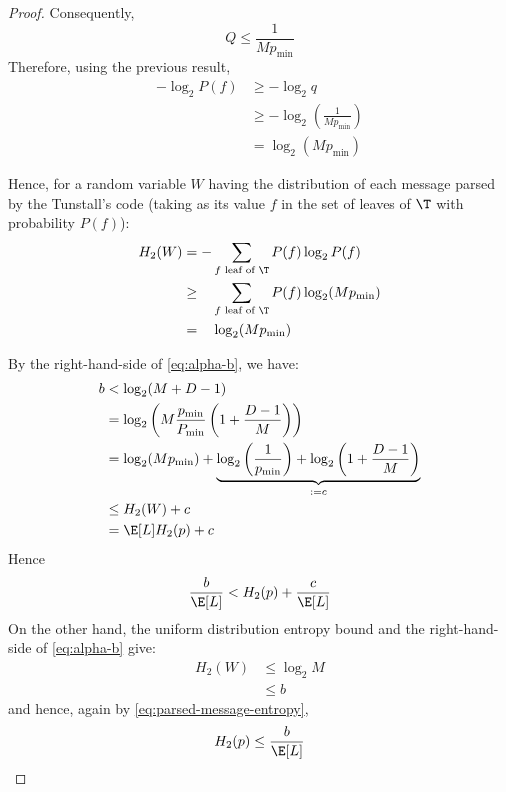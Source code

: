\documentclass[toc, titlepaged]{../cs-classes/cs-classes}
\begin{document}
\begin{proof}
    Consequently,
    \begin{equation*}
        Q \leq \frac{1}{Mp_{\min}}
    \end{equation*}
    Therefore, using the previous result,
    \begin{equation*}
        \begin{aligned}
            -\log_2P(f) &\geq -\log_2 q\\
            &\geq -\log_2\left(\frac{1}{Mp_{\min}}\right)\\
            &= \log_2(Mp_{\min})
        \end{aligned}
    \end{equation*}

    Hence, for a random variable $W$ having the distribution of each message parsed by the Tunstall's code (taking as its value $f$ in the set of leaves of $\T$ with probability $P(f)$):
    \begin{equation*}
        \begin{aligned}
            H_2(W) &= -\sum_{f \textnormal{ leaf of }\T}P(f)\log_2P(f)\\
            &\geq \phantom{-} \sum_{f \textnormal{ leaf of }\T}P(f)\log_2(Mp_{\min})\\
            &= \phantom{-} \log_2(Mp_{\min})
        \end{aligned}
    \end{equation*}

    By the right-hand-side of \eqref{eq:alpha-b}, we have:
    \begin{equation*}
        \begin{aligned}
            b &< \log_2(M+D-1)\\
            &= \log_2\left(M\frac{p_{\min}}{P_{\min}}\left(1+\frac{D-1}{M}\right)\right)\\
            &= \log_2(Mp_{\min}) + \underbrace{\log_2\left(\frac{1}{p_{\min}}\right) + \log_2\left(1+\frac{D-1}{M}\right)}_{:= c}\\
            &\leq H_2(W) + c\\
            &= \E[L] H_2(p) + c
        \end{aligned}
    \end{equation*}
    Hence
    \begin{equation*}
        \frac{b}{\E[L]} < H_2(p) + \frac{c}{\E[L]}
    \end{equation*}
    On the other hand, the uniform distribution entropy bound and the right-hand-side of \eqref{eq:alpha-b} give:
    \begin{equation*}
        \begin{aligned}
            H_2(W)&\leq\log_2M\\
            &\leq b
        \end{aligned}
    \end{equation*}
    and hence, again by \eqref{eq:parsed-message-entropy},
    \begin{equation*}
        H_2(p)\leq\frac{b}{\E[L]}
    \end{equation*}


\end{proof}
\end{document}
